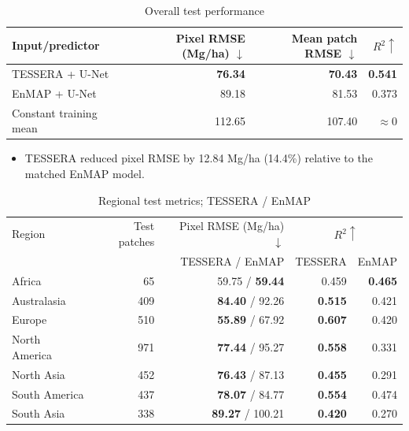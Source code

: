 \documentclass[11pt]{article}
\begin{document}
\begin{table}[H]
	\centering
	\caption{Overall test performance}
	\small
	\begin{tabular}{@{}lrrr@{}}
		\toprule
		Input/predictor        & Pixel RMSE (Mg/ha) $\downarrow$ & Mean patch RMSE $\downarrow$ & $R^2\uparrow$  \\
		\midrule
		TESSERA + U-Net        & \textbf{76.34}                  & \textbf{70.43}               & \textbf{0.541} \\
		EnMAP + U-Net          & 89.18                           & 81.53                        & 0.373          \\
		Constant training mean & 112.65                          & 107.40                       & $\approx0$     \\
		\bottomrule
	\end{tabular}
\end{table}

\begin{itemize}
	\item TESSERA reduced pixel RMSE by 12.84 Mg/ha (14.4\%) relative to the matched EnMAP model.
\end{itemize}

\begin{table}[H]
	\centering
	\caption{Regional test metrics; TESSERA / EnMAP}
	\small
	\begin{tabular}{@{}lrrrr@{}}
		\toprule
		Region        & Test patches & Pixel RMSE (Mg/ha) $\downarrow$ & \multicolumn{2}{c}{$R^2\uparrow$}                  \\
		              &              & TESSERA / EnMAP                 & TESSERA                           & EnMAP          \\
		\midrule
		Africa        & 65           & 59.75 / \textbf{59.44}          & 0.459                             & \textbf{0.465} \\
		Australasia   & 409          & \textbf{84.40} / 92.26          & \textbf{0.515}                    & 0.421          \\
		Europe        & 510          & \textbf{55.89} / 67.92          & \textbf{0.607}                    & 0.420          \\
		North America & 971          & \textbf{77.44} / 95.27          & \textbf{0.558}                    & 0.331          \\
		North Asia    & 452          & \textbf{76.43} / 87.13          & \textbf{0.455}                    & 0.291          \\
		South America & 437          & \textbf{78.07} / 84.77          & \textbf{0.554}                    & 0.474          \\
		South Asia    & 338          & \textbf{89.27} / 100.21         & \textbf{0.420}                    & 0.270          \\
		\bottomrule
	\end{tabular}
\end{table}
\end{document}
